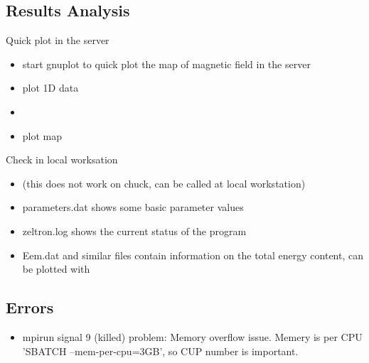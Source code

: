 \subsection{Results Analysis}


Quick plot in the server

\begin{itemize}
\item {} start gnuplot to quick plot the map of magnetic field in the server
\item {} plot 1D data
\item {} 
\item {} plot map
\end{itemize}


Check in local worksation

\begin{itemize}
\item{} (this does not work on chuck, can be called at local workstation)
\item parameters.dat shows some basic parameter values
\item zeltron.log shows the current status of the program
\item Eem.dat and similar files contain information on the total energy content, can be plotted with
\end{itemize}


\subsection{Errors}

\begin{itemize}
\item mpirun signal 9 (killed) problem: Memory overflow issue. Memery is per CPU 'SBATCH --mem-per-cpu=3GB', so CUP number is important.
\end{itemize}


